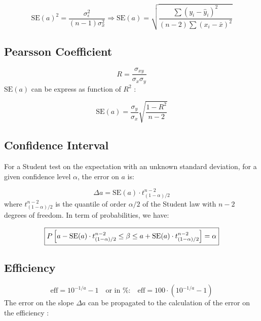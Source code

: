 \documentclass[a4paper,10pt]{article}
\begin{document}
\begin{equation}
 \text{SE}(a)^2 = \dfrac{\sigma_{\epsilon}^2}{(n-1)\sigma_x^2} \Longrightarrow
\boxed{\text{SE}(a) =
\sqrt{\dfrac{\sum(y_i-\hat{y}_i)^2}{
(n-2)\sum (x_i-\bar{x})^2}}}
\end{equation}

\subsection{Pearsson Coefficient}

\begin{equation}
 R = \dfrac{\sigma_{xy}}{\sigma_x\sigma_y}
\end{equation}
$\text{SE}(a)$ can be express as function of $R^2$ :

\begin{equation}
 \text{SE}(a) = \dfrac{\sigma_y}{\sigma_x}\sqrt{\dfrac{1-R^2}{n-2}}
\end{equation}


\subsection{Confidence Interval}
For a Student test on the expectation with an unknown standard deviation, for a given confidence level $\alpha$, the error on $a$ is: 

\begin{equation}
 \Delta a = \text{SE}(a) \cdot t_{(1-\alpha)/2}^{n-2}
\end{equation}
where $t_{(1-\alpha)/2}^{n-2}$ is the quantile of order $\alpha/2$ of the Student law with $n-2$ degrees of freedom. In term of probabilities, we have: 

\begin{equation}
\boxed{%
 P\left[a- \text{SE}(a) \cdot t_{(1-\alpha)/2}^{n-2}\le \beta\le a +\text{SE}(a)
\cdot
t_{(1-\alpha)/2}^{n-2}\right] = \alpha}
\end{equation}

\subsection{Efficiency}

\begin{equation}
 \text{eff} = 10^{-1/a}-1\quad \text{or in \%:}\quad \text{eff}
=100\cdot\left(10^{-1/a}-1\right)
\end{equation}
The error on the slope $\Delta a$ can be propagated to the calculation of the error on the efficiency :
\end{document}
